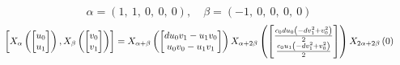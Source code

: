 \documentclass[11pt]{article}
\theoremstyle{definition}
\begin{document}
\[
\alpha = \left( 1, \  1, \  0, \  0, \  0\right), \quad \beta = \left( -1, \  0, \  0, \  0, \  0\right)
\]
\[
\scaletoalign{\textwidth}{\left[ X_{\alpha}\left(\left[\begin{matrix}u_{0}\\u_{1}\end{matrix}\right]\right), X_{\beta}\left(\left[\begin{matrix}v_{0}\\v_{1}\end{matrix}\right]\right) \right] = X_{\alpha + \beta}\left(\left[\begin{matrix}d u_{0} v_{1} - u_{1} v_{0}\\u_{0} v_{0} - u_{1} v_{1}\end{matrix}\right]\right) X_{\alpha + 2\beta}\left(\left[\begin{matrix}\frac{c_{0} d u_{0} \left(- d v_{1}^{2} + v_{0}^{2}\right)}{2}\\\frac{c_{0} u_{1} \left(- d v_{1}^{2} + v_{0}^{2}\right)}{2}\end{matrix}\right]\right) X_{2\alpha + 2\beta}\left(0\right)}
\]
\end{document}
